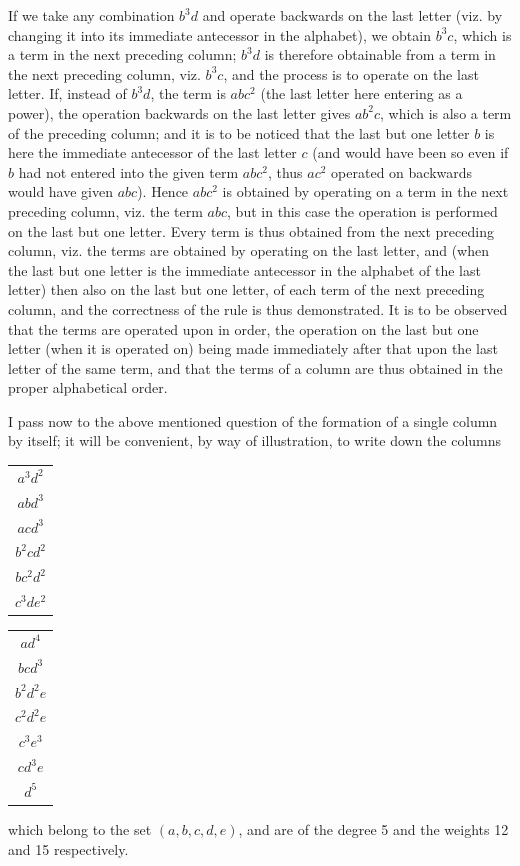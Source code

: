 \documentclass[11pt,a4paper]{book}
\begin{document}
If we take any combination $b^3d$ and operate backwards on the last letter (viz. by changing it into its immediate antecessor in the alphabet), we obtain $b^3c$, which is a term in the next preceding column; $b^3d$ is therefore obtainable from a term in the next preceding column, viz. $b^3c$, and the process is to operate on the last letter. If, instead of $b^3d$, the term is $abc^2$ (the last letter here entering as a power), the operation backwards on the last letter gives $ab^2c$, which is also a term of the preceding column; and it is to be noticed that the last but one letter $b$ is here the immediate antecessor of the last letter $c$ (and would have been so even if $b$ had not entered into the given term $abc^2$, thus $ac^2$ operated on backwards would have given $abc$). Hence $abc^2$ is obtained by operating on a term in the next preceding column, viz. the term $abc$, but in this case the operation is performed on the last but one letter. Every term is thus obtained from the next preceding column, viz. the terms are obtained by operating on the last letter, and (when the last but one letter is the immediate antecessor in the alphabet of the last letter) then also on the last but one letter, of each term of the next preceding column, and the correctness of the rule is thus demonstrated. It is to be observed that the terms are operated upon in order, the operation on the last but one letter (when it is operated on) being made immediately after that upon the last letter of the same term, and that the terms of a column are thus obtained in the proper alphabetical order.

I pass now to the above mentioned question of the formation of a single column by itself; it will be convenient, by way of illustration, to write down the columns
\begin{center}
\begin{tabular}{c}
$a^3d^2$ \\
$abd^3$ \\
$acd^3$ \\
$b^2cd^2$ \\
$bc^2d^2$ \\
$c^3de^2$ \\
\end{tabular}
\qquad
\begin{tabular}{c}
$ad^4$ \\
$bcd^3$ \\
$b^2d^2e$ \\
$c^2d^2e$ \\
$c^3e^3$ \\
$cd^3e$ \\
$d^5$ \\
\end{tabular}
\end{center}
which belong to the set $(a,b,c,d,e)$, and are of the degree 5 and the weights 12 and 15 respectively.
\end{document}
